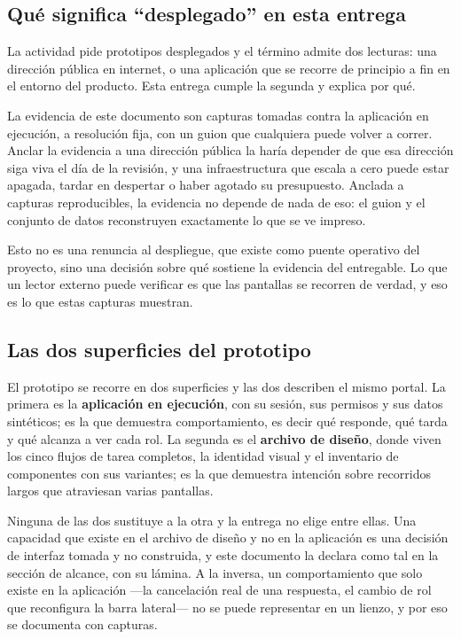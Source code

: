 \subsection{Qué significa \enquote{desplegado} en esta entrega}

La actividad pide prototipos desplegados y el término admite dos lecturas: una dirección pública en
internet, o una aplicación que se recorre de principio a fin en el entorno del producto. Esta
entrega cumple la segunda y explica por qué.

La evidencia de este documento son capturas tomadas contra la aplicación en ejecución, a resolución
fija, con un guion que cualquiera puede volver a correr. Anclar la evidencia a una dirección pública
la haría depender de que esa dirección siga viva el día de la revisión, y una infraestructura que
escala a cero puede estar apagada, tardar en despertar o haber agotado su presupuesto. Anclada a
capturas reproducibles, la evidencia no depende de nada de eso: el guion y el conjunto de datos
reconstruyen exactamente lo que se ve impreso.

Esto no es una renuncia al despliegue, que existe como puente operativo del proyecto, sino una
decisión sobre qué sostiene la evidencia del entregable. Lo que un lector externo puede verificar es que
las pantallas se recorren de verdad, y eso es lo que estas capturas muestran.

\subsection{Las dos superficies del prototipo}

El prototipo se recorre en dos superficies y las dos describen el mismo portal. La primera es la
\textbf{aplicación en ejecución}, con su sesión, sus permisos y sus datos sintéticos; es la que
demuestra comportamiento, es decir qué responde, qué tarda y qué alcanza a ver cada rol. La segunda
es el \textbf{archivo de diseño}, donde viven los cinco flujos de tarea completos, la identidad
visual y el inventario de componentes con sus variantes; es la que demuestra intención sobre
recorridos largos que atraviesan varias pantallas.

Ninguna de las dos sustituye a la otra y la entrega no elige entre ellas. Una capacidad que existe
en el archivo de diseño y no en la aplicación es una decisión de interfaz tomada y no construida, y
este documento la declara como tal en la sección de alcance, con su lámina. A la inversa, un
comportamiento que solo existe en la aplicación ---la cancelación real de una respuesta, el cambio
de rol que reconfigura la barra lateral--- no se puede representar en un lienzo, y por eso se
documenta con capturas.

